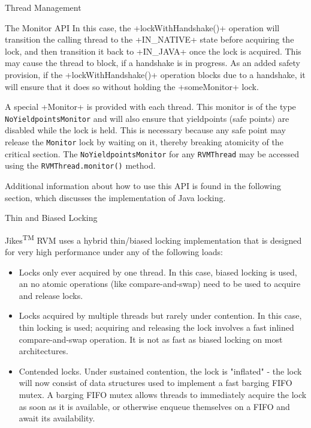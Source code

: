 \begin{section}{Thread Management}
\begin{subsection}{The Monitor API}
In this case, the \spverb+lockWithHandshake()+ operation will transition the calling thread to the \spverb+IN_NATIVE+ state before acquiring the lock, and then transition it back to \spverb+IN_JAVA+ once the lock is acquired. This may cause the thread to block, if a handshake is in progress. As an added safety provision, if the \spverb+lockWithHandshake()+ operation blocks due to a handshake, it will ensure that it does so without holding the \spverb+someMonitor+ lock.

A special \spverb+Monitor+ is provided with each thread. This monitor is of the type \texttt{No\-Yield\-points\-Mo\-ni\-tor} and will also ensure that yieldpoints (safe points) are disabled while the lock is held. This is necessary because any safe point may release the \texttt{Monitor} lock by waiting on it, thereby breaking atomicity of the critical section. The \texttt{No\-Yield\-points\-Mo\-ni\-tor} for any \texttt{RVM\-Thread} may be accessed using the \texttt{RVM\-Thread.mo\-ni\-tor()} method.

Additional information about how to use this API is found in the following section, which discusses the implementation of Java locking.

\end{subsection}

\begin{subsection}{Thin and Biased Locking}

Jikes\textsuperscript{TM} RVM uses a hybrid thin/biased locking implementation that is designed for very high performance under any of the following loads:
\begin{itemize}
  \item Locks only ever acquired by one thread. In this case, biased locking is used, an no atomic operations (like compare-and-swap) need to be used to acquire and release locks.
  \item Locks acquired by multiple threads but rarely under contention. In this case, thin locking is used; acquiring and releasing the lock involves a fast inlined compare-and-swap operation. It is not as fast as biased locking on most architectures.
  \item Contended locks. Under sustained contention, the lock is "inflated" - the lock will now consist of data structures used to implement a fast barging FIFO mutex. A barging FIFO mutex allows threads to immediately acquire the lock as soon as it is available, or otherwise enqueue themselves on a FIFO and await its availability.
\end{itemize}


\end{subsection}
\end{section}
